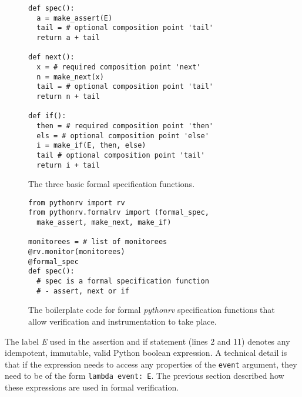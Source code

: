 \documentclass[a4paper,11pt]{kth-mag}
\theoremstyle{definition}
\begin{document}
\begin{figure}[h!]
	\begin{center}
	\begin{minipage}{0.7\textwidth}
	\begin{lstlisting}
def spec():
  a = make_assert(E)
  tail = # optional composition point 'tail'
  return a + tail

def next():
  x = # required composition point 'next'
  n = make_next(x)
  tail = # optional composition point 'tail'
  return n + tail

def if():
  then = # required composition point 'then'
  els = # optional composition point 'else'
  i = make_if(E, then, else)
  tail # optional composition point 'tail'
  return i + tail
	\end{lstlisting}
	\end{minipage}
	\end{center}

	\caption{The three basic formal specification functions.}
	\label{figure-basic-formal-specification-functions}
\end{figure}

\begin{figure}[h!]
	\begin{center}
	\begin{minipage}{0.7\textwidth}
	\begin{lstlisting}
from pythonrv import rv
from pythonrv.formalrv import (formal_spec,
  make_assert, make_next, make_if)

monitorees = # list of monitorees
@rv.monitor(monitorees)
@formal_spec
def spec():
  # spec is a formal specification function
  # - assert, next or if
	\end{lstlisting}
	\end{minipage}
	\end{center}

  \caption{The boilerplate code for formal \textit{pythonrv} specification
  functions that allow verification and instrumentation to take place.}
	\label{figure-formal-boilerplate}
\end{figure}

The label \textit{E} used in the assertion and if statement (lines 2 and 11)
denotes any idempotent, immutable, valid Python boolean expression. A technical
detail is that if the expression needs to access any properties of the
\texttt{event} argument, they need to be of the form \texttt{lambda event: E}.
The previous section described how these expressions are used in formal
verification.
\end{document}
